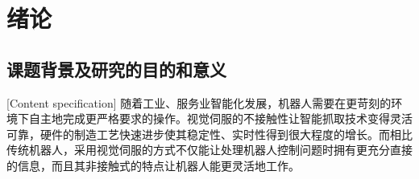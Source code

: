 \documentclass[fontset=fandol,type=bachelor,campus=harbin]{hithesisbook}
\begin{document}
\frontmatter
\makecover
\tableofcontents %
\mainmatter
%













\chapter[绪论]{绪论}
\section{课题背景及研究的目的和意义}[Content specification]
随着工业、服务业智能化发展，机器人需要在更苛刻的环境下自主地完成更严格要求的操作。视觉伺服的不接触性让智能抓取技术变得灵活可靠，硬件的制造工艺快速进步使其稳定性、实时性得到很大程度的增长。而相比传统机器人，采用视觉伺服的方式不仅能让处理机器人控制问题时拥有更充分直接的信息，而且其非接触式的特点让机器人能更灵活地工作\cite{徐鑫莉2015工业机器人视觉伺服控制系统设计,陶波2016机器人无标定视觉伺服控制研究进展}。
\end{document}
